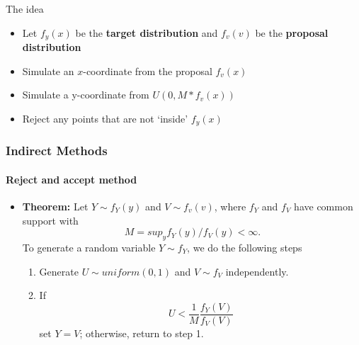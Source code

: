 \documentclass[10pt]{beamer}
\begin{document}
              \begin{frame}{The idea}
                \begin{itemize}
                \item Let $f_y(x)$ be the {\bf target distribution} and $f_v(v)$ be the {\bf proposal distribution}

                \item Simulate an $x$-coordinate from the proposal $f_v(x)$

                \item Simulate a y-coordinate from $U(0, M*f_v(x))$

                \item Reject any points that are not `inside' $f_y(x)$
                \end{itemize}
              \end{frame}



              \begin{frame}
                \frametitle{Indirect Methods}
                \framesubtitle{Reject and accept method}

                \begin{itemize}
                \item \textbf{Theorem:} Let $Y \sim f_Y(y)$ and $V \sim f_v(v)$,
                  where $f_Y$ and $f_V$ have common support with
                  \begin{equation*}
                    M = sup_y f_Y(y)/f_V(y) < \infty.
                  \end{equation*}
                  To generate a random variable $Y\sim f_Y$, we do the following
                  steps
                  \begin{enumerate}
                  \item Generate $U\sim uniform(0,1)$ and $V\sim f_V$ independently.
                  \item If
                    \begin{equation*}
                      U < \frac{1}{M} \frac{f_Y(V)}{f_V(V)}
                    \end{equation*}
                    set $Y = V$; otherwise, return to step 1.
                  \end{enumerate}

                \end{itemize}
              \end{frame}
\end{document}
